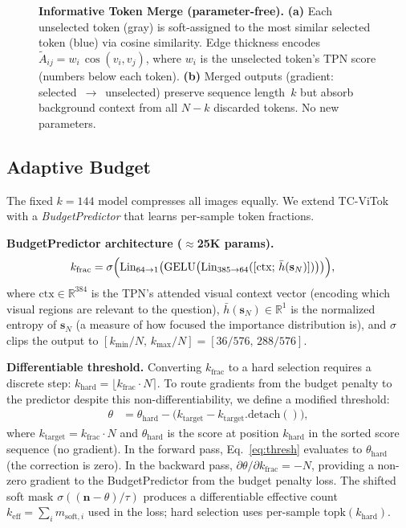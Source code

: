 \documentclass{article}
\newcommand{\sN}{\mathbf{s}_N}
\begin{document}
\begin{figure}[t]
{%
}
\caption{\textbf{Informative Token Merge (parameter-free).}
\textbf{(a)} Each unselected token (gray) is soft-assigned to the most similar
selected token (blue) via cosine similarity. Edge thickness encodes
$\tilde{A}_{ij}{=}w_i\,\cos(v_i,v_j)$, where $w_i$ is the unselected token's TPN score
(numbers below each token).
\textbf{(b)} Merged outputs (gradient: selected~$\to$~unselected) preserve sequence length~$k$ but absorb background context from all $N{-}k$ discarded tokens. No new parameters.}
\label{fig:merge}
\end{figure}

\subsection{Adaptive Budget}
\label{sec:adaptive}

The fixed $k{=}144$ model compresses all images equally.
We extend TC-ViTok with a \emph{BudgetPredictor} that learns per-sample token fractions.

\textbf{BudgetPredictor architecture ($\approx$25K params).}
\begin{align}
  k_{\mathrm{frac}} = \sigma\Bigl(
    &\mathrm{Lin}_{64 \to 1}\bigl(\mathrm{GELU}\bigl(
      \mathrm{Lin}_{385 \to 64}([\mathrm{ctx};\, \bar{h}(\sN)])
    \bigr)\bigr)
  \Bigr), \label{eq:bp}
\end{align}
where $\mathrm{ctx} \in \mathbb{R}^{384}$ is the TPN's attended visual context vector
(encoding which visual regions are relevant to the question),
$\bar{h}(\sN) \in \mathbb{R}^{1}$ is the normalized entropy of $\sN$
(a measure of how focused the importance distribution is),
and $\sigma$ clips the output to $[k_{\min}/N,\, k_{\max}/N] = [36/576,\, 288/576]$.

\textbf{Differentiable threshold.}
Converting $k_{\mathrm{frac}}$ to a hard selection requires a discrete step:
$k_{\mathrm{hard}} = \lfloor k_{\mathrm{frac}} \cdot N \rceil$.
To route gradients from the budget penalty to the predictor despite this
non-differentiability, we define a modified threshold:
\begin{align}
  \theta &= \theta_{\mathrm{hard}}
    - \bigl(k_{\mathrm{target}} - k_{\mathrm{target}}.\mathrm{detach}()\bigr),
  \label{eq:thresh}
\end{align}
where $k_{\mathrm{target}} = k_{\mathrm{frac}} \cdot N$ and
$\theta_{\mathrm{hard}}$ is the score at position $k_{\mathrm{hard}}$
in the sorted score sequence (no gradient).
In the forward pass, Eq.~\eqref{eq:thresh} evaluates to $\theta_{\mathrm{hard}}$
(the correction is zero).
In the backward pass, $\partial\theta/\partial k_{\mathrm{frac}} = -N$,
providing a non-zero gradient to the BudgetPredictor from the budget penalty loss.
The shifted soft mask $\sigma((\mathbf{n} - \theta)/\tau)$
produces a differentiable effective count $k_{\mathrm{eff}} = \sum_i m_{\mathrm{soft},i}$
used in the loss; hard selection uses per-sample $\mathrm{topk}(k_{\mathrm{hard}})$.
\end{document}
